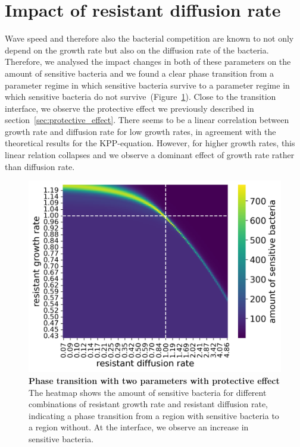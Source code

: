 \section{Impact of resistant diffusion rate}
Wave speed and therefore also the bacterial competition are known to not only depend on the growth rate but also on the diffusion rate of the bacteria. Therefore, we analysed the impact changes in both of these parameters on the amount of sensitive bacteria and we found a clear phase transition from a parameter regime in which sensitive bacteria survive to a parameter regime in which sensitive bacteria do not survive~(Figure~\ref{fig:results_heatmap_effect}). Close to the transition interface, we observe the protective effect we previously described in section~\ref{sec:protective_effect}. There seems to be a linear correlation between growth rate and diffusion rate for low growth rates, in agreement with the theoretical results for the KPP-equation. However, for higher growth rates, this linear relation collapses and we observe a dominant effect of growth rate rather than diffusion rate.
\begin{figure}
\centering
\includegraphics[width=\linewidth]{graphics/2025_09_30_phages_fig9.png}
\caption{\textbf{Phase transition with two parameters with protective effect} The heatmap shows the amount of sensitive bacteria for different combinations of resistant growth rate and resistant diffusion rate, indicating a phase transition from a region with sensitive bacteria to a region without. At the interface, we observe an increase in sensitive bacteria.}
\label{fig:results_heatmap_effect}
\end{figure}

